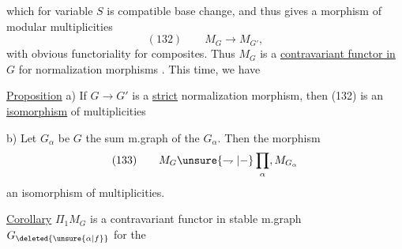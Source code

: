 which for variable $S$ is compatible  base change, and thus gives a morphism of modular multiplicities 
\[
(132)\qquad M_G\longrightarrow M_{G'},
\]
with obvious functoriality for composites. Thus $M_G$ is a \uline{contravariant functor in} $G$ for normalization morphisms . This time, we have

\uline{Proposition} a) If $G\longrightarrow G'$ is a \uline{strict} normalization morphism, then (132) is an \uline{isomorphism} of multiplicities

b) Let $G_\alpha$ be   $G$ the sum m.graph of the $G_\alpha$. Then\unsure{:|,} the morphism
\[
(133)\qquad M_G\unsure{\rightharpoondown|{-}}\prod_\alpha, M_{G_\alpha}
\]
 an isomorphism of multiplicities.

\uline{Corollary} $\Pi_1M_G$ is a contravariant functor in  stable m.graph $G_{\deleted{\unsure{\alpha|f}}}$ for the
